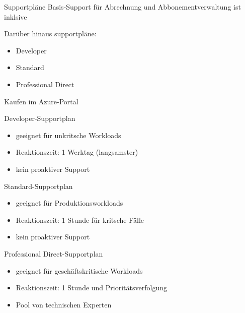 
\begin{flashcard}[\ ]{Supportpläne}
    Basis-Support für Abrechnung und Abbonementverwaltung ist inklsive

    \vspace{5mm}
    Darüber hinaus supportpläne:
    \begin{itemize}
        \item Developer
        \item Standard
        \item Professional Direct
    \end{itemize}

    \vspace{5mm}
    Kaufen im Azure-Portal
\end{flashcard}

\begin{flashcard}[Eigenschaften]{Developer-Supportplan}
    \begin{itemize}
        \item geeignet für unkritsche Workloads
        \item Reaktionszeit: 1 Werktag (langsamster)
        \item kein proaktiver Support
    \end{itemize}
\end{flashcard}

\begin{flashcard}[Eigenschaften]{Standard-Supportplan}
    \begin{itemize}
        \item geeignet für Produktionsworkloads
        \item Reaktionszeit: 1 Stunde für kritsche Fälle
        \item kein proaktiver Support
    \end{itemize}
\end{flashcard}

\begin{flashcard}[Eigenschaften]{Professional Direct-Supportplan}
    \begin{itemize}
        \item geeignet für geschäftskritische Workloads
        \item Reaktionszeit: 1 Stunde und Prioritätsverfolgung
        \item Pool von technischen Experten
    \end{itemize}
\end{flashcard}

